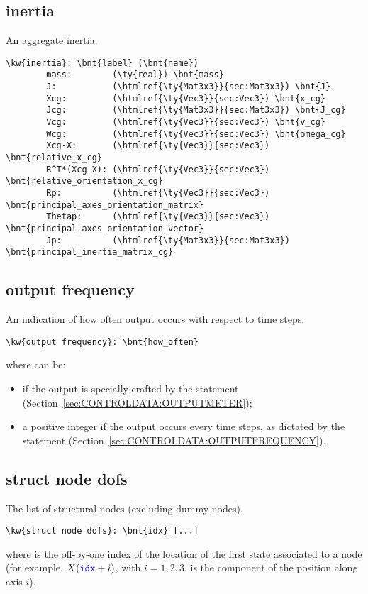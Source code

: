 \subsection{inertia}
An aggregate inertia.
\begin{Verbatim}[commandchars=\\\{\}]
    \kw{inertia}: \bnt{label} (\bnt{name})
        mass:        (\ty{real}) \bnt{mass}
        J:           (\htmlref{\ty{Mat3x3}}{sec:Mat3x3}) \bnt{J}
        Xcg:         (\htmlref{\ty{Vec3}}{sec:Vec3}) \bnt{x_cg}
        Jcg:         (\htmlref{\ty{Mat3x3}}{sec:Mat3x3}) \bnt{J_cg}
        Vcg:         (\htmlref{\ty{Vec3}}{sec:Vec3}) \bnt{v_cg}
        Wcg:         (\htmlref{\ty{Vec3}}{sec:Vec3}) \bnt{omega_cg}
        Xcg-X:       (\htmlref{\ty{Vec3}}{sec:Vec3}) \bnt{relative_x_cg}
        R^T*(Xcg-X): (\htmlref{\ty{Vec3}}{sec:Vec3}) \bnt{relative_orientation_x_cg}
        Rp:          (\htmlref{\ty{Vec3}}{sec:Vec3}) \bnt{principal_axes_orientation_matrix}
        Thetap:      (\htmlref{\ty{Vec3}}{sec:Vec3}) \bnt{principal_axes_orientation_vector}
        Jp:          (\htmlref{\ty{Mat3x3}}{sec:Mat3x3}) \bnt{principal_inertia_matrix_cg}
\end{Verbatim}

\subsection{output frequency}
An indication of how often output occurs with respect to time steps.
\begin{Verbatim}[commandchars=\\\{\}]
\kw{output frequency}: \bnt{how_often}
\end{Verbatim}
where  can be:
\begin{itemize}
\item {} if the output is specially crafted by the
 statement (Section~\ref{sec:CONTROLDATA:OUTPUTMETER});
\item a positive integer if the output occurs every 
time steps, as dictated by the  statement
(Section~\ref{sec:CONTROLDATA:OUTPUTFREQUENCY}).
\end{itemize}

\subsection{struct node dofs}
The list of structural nodes (excluding dummy nodes).
\begin{Verbatim}[commandchars=\\\{\}]
\kw{struct node dofs}: \bnt{idx} [...]
\end{Verbatim}
where  is the off-by-one index of the location of the first
state associated to a node (for example, $X(\textcolor{blue}{\texttt{idx}} + i)$, with $i = 1,2,3$,
is the component of the position along axis $i$).

